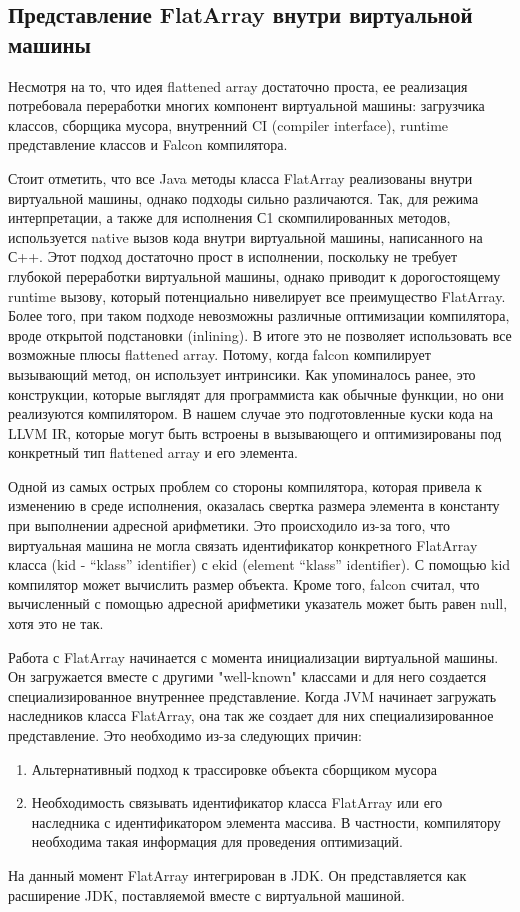 \subsection{Представление FlatArray внутри виртуальной машины}
Несмотря на то, что идея flattened array достаточно проста, ее реализация потребовала переработки многих компонент виртуальной машины: загрузчика классов, сборщика мусора, внутренний CI (compiler interface), runtime представление классов и Falcon компилятора.
\par 
Стоит отметить, что все Java методы класса FlatArray реализованы внутри виртуальной машины, однако подходы сильно различаются. Так, для режима интерпретации, а также для исполнения С1 скомпилированных методов, используется native вызов кода внутри виртуальной машины, написанного на С++. Этот подход достаточно прост в исполнении, поскольку не требует глубокой переработки виртуальной машины, однако приводит к дорогостоящему runtime вызову, который потенциально нивелирует все преимущество FlatArray. Более того, при таком подходе невозможны различные оптимизации компилятора, вроде открытой подстановки (inlining).
В итоге это не позволяет использовать все возможные плюсы flattened array. Потому, когда falcon компилирует вызывающий метод, он использует интринсики. Как упоминалось ранее, это конструкции, которые выглядят для программиста как обычные функции, но они реализуются компилятором. В нашем случае это подготовленные куски кода на LLVM IR, которые могут быть встроены в вызывающего и оптимизированы под конкретный тип flattened array и его элемента.  
\par
Одной из самых острых проблем со стороны компилятора, которая привела к изменению в среде исполнения, оказалась свертка размера элемента в константу при выполнении адресной арифметики. Это происходило из-за того, что виртуальная машина не могла связать идентификатор конкретного FlatArray класса (kid - “klass” identifier) с ekid (element “klass” identifier). С помощью kid компилятор может вычислить размер объекта. Кроме того, falcon считал, что вычисленный с помощью адресной арифметики указатель может быть равен null, хотя это не так. 
\par 
Работа с FlatArray начинается с момента инициализации виртуальной машины. Он загружается вместе с другими "well-known" классами и для него создается специализированное внутреннее представление. 
Когда JVM начинает загружать наследников класса FlatArray, она так же создает для них специализированное представление.
Это необходимо из-за следующих причин:
\begin{enumerate}
	\item Альтернативный подход к трассировке объекта сборщиком мусора
	\item Необходимость связывать идентификатор класса FlatArray или его наследника с идентификатором элемента массива. В частности, компилятору необходима такая информация для проведения оптимизаций.
\end{enumerate}
\par
На данный момент FlatArray интегрирован в JDK. Он представляется как расширение JDK, поставляемой вместе с виртуальной машиной.
